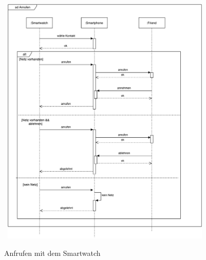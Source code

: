 \begin{figure}[H]
\centering\
\includegraphics[width=10cm]{img/AnrufenSequenz}
\caption{Anfrufen mit dem Smartwatch}\label{fig:anruf}
\end{figure}






